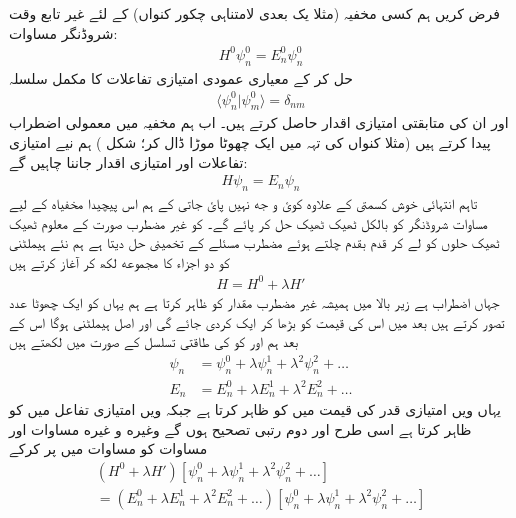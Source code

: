 

فرض کریں ہم کسی مخفیہ (مثلا يک بعدی لامتناہی چکور کنواں) کے لئے غیر تابع وقت شروڈنگر مساوات:
\begin{align}\label{مساوات_اضطراب_پہلی}
H^0\psi_n^0=E_n^0\psi_n^0
\end{align}
حل کر کے معیاری عمودی امتیازی تفاعلات  کا مکمل سلسلہ
\begin{align}
\langle \psi_n^0 | \psi_m^0 \rangle = \delta_{nm}
\end{align}
اور ان کی متابقتى امتیازی اقدار  حاصل کرتے ہیں۔ اب ہم مخفیہ میں معمولی اضطراب پیدا کرتے ہیں (مثلا کنواں کی تہہ میں ایک چھوٹا موڑا ڈال کر؛ شكل ) ہم نیے امتیازی تفاعلات اور امتیازی اقدار جاننا چاہیں گے: 
\begin{align}\label{مساوات_اضطراب_بنیادی}
H\psi_n = E_n\psi_n
\end{align}
تاہم انتہائی خوش كسمتى کے علاوه کوئ و جه نہیں پائ جاتی کے ہم اس پیچیدا مخفياه کے لیے مساوات شروڈنگر کو بالکل ٹھیک ٹھیک حل کر پائے گے۔  کو غير مضطرب صورت کے معلوم ٹھیک ٹھیک حلوں کو لے کر قدم بقدم چلتے ہوئے مضطرب مسئلے کے تخمينى حل دیتا ہے ہم نئے ہيملٹنی کو دو اجزاء کا مجموعه لکھ کر آغاز کرتے ہیں 
\begin{align}
H = H^0 + \lambda H'
\end{align}
جہاں  اضطراب ہے زیر بالا میں  ہمیشہ غير مضطرب مقدار کو ظاہر کرتا ہے ہم یہاں  کو ایک چھوٹا عدد تصور کرتے ہیں بعد میں اس کی قيمت کو بڑھا کر ایک  کردی جائے گی اور  اصل ہیملٹنی ہوگا اس کے بعد ہم  اور  کو  کی طاقتی تسلسل کے صورت میں لکھتے ہیں 
\begin{align}
\psi_n &= \psi_n^0 + \lambda\psi_n^1 + \lambda^2\psi_n^2+\dotsc \label{مساوات_اضطراب_سائے_این}\\
E_n &= E_n^0 + \lambda E_n^1 + \lambda^2 E_n^2+\dotsc \label{مساوات_اضطراب_ای_این}
\end{align} 
یہاں  ویں امتيازى قدر کی قیمت میں  کو  ظاہر کرتا ہے جبکہ  ویں امتيازى تفاعل میں  کو   ظاہر کرتا ہے اسی طرح  اور  دوم رتبی تصحيح ہوں گے وغيره و غيره مساوات  اور مساوات  کو مساوات  میں پر کرکے 
\begin{multline*}
(H^0 + \lambda H')[\psi_n^0 + \lambda \psi_n^1 + \lambda^2 \psi_n^2 + \dotsc]\\
= (E_n^0 + \lambda E_n^1 + \lambda^2 E_n^2 + \dotsc)[\psi_n^0 + \lambda \psi_n^1 + \lambda^2 \psi_n^2 + \dotsc]
\end{multline*}
